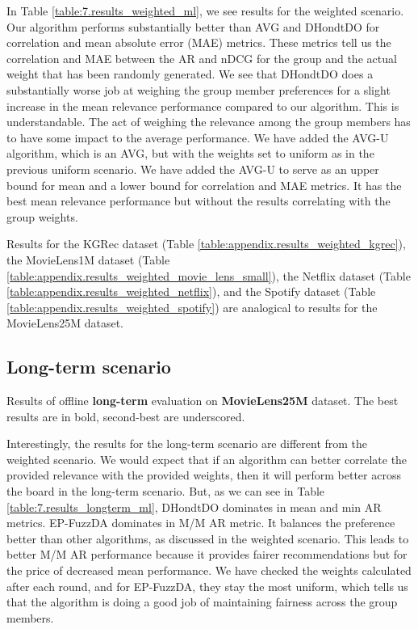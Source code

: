 In Table \ref{table:7.results_weighted_ml}, we see results for the weighted scenario. Our algorithm performs substantially better than AVG and DHondtDO for correlation and mean absolute error (MAE) metrics. These metrics tell us the correlation and MAE between the AR and nDCG for the group and the actual weight that has been randomly generated. We see that DHondtDO does a substantially worse job at weighing the group member preferences for a slight increase in the mean relevance performance compared to our algorithm. This is understandable. The act of weighing the relevance among the group members has to have some impact to the average performance. We have added the AVG-U algorithm, which is an AVG, but with the weights set to uniform as in the previous uniform scenario. We have added the AVG-U to serve as an upper bound for mean and a lower bound for correlation and MAE metrics. It has the best mean relevance performance but without the results correlating with the group weights.

Results for the KGRec dataset (Table \ref{table:appendix.results_weighted_kgrec}), 
the MovieLens1M dataset (Table \ref{table:appendix.results_weighted_movie_lens_small}), 
the Netflix dataset (Table \ref{table:appendix.results_weighted_netflix}), 
and the Spotify dataset (Table \ref{table:appendix.results_weighted_spotify})
are analogical to results for the MovieLens25M dataset.

\subsection{Long-term scenario}

\begin{table}[!ht]
    \centering
    \scalebox{0.82}{\hspace*{-1.2cm}{
        
    }}\hspace*{-1.3cm}
    \caption[Results of offline long-term evaluation on Netflix dataset]{Results of offline \textbf{long-term} evaluation on \textbf{MovieLens25M} dataset. The best results are in bold, second-best are underscored.}
    \label{table:7.results_longterm_ml}
\end{table}

Interestingly, the results for the long-term scenario are different from the weighted scenario. We would expect that if an algorithm can better correlate the provided relevance with the provided weights, then it will perform better across the board in the long-term scenario. But, as we can see in Table \ref{table:7.results_longterm_ml}, DHondtDO dominates in mean and min AR metrics. EP-FuzzDA dominates in M/M AR metric. It balances the preference better than other algorithms, as discussed in the weighted scenario. This leads to better M/M AR performance because it provides fairer recommendations but for the price of decreased mean performance. We have checked the weights calculated after each round, and for EP-FuzzDA, they stay the most uniform, which tells us that the algorithm is doing a good job of maintaining fairness across the group members.

